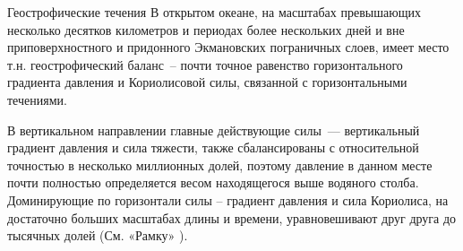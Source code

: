 
\begin{chapter}{Геострофические течения}\label{chap:10}
В открытом океане, на масштабах превышающих несколько десятков
километров и периодах более нескольких дней и вне приповерхностного и
придонного Экмановских пограничных слоев, имеет место
т.н. геострофический баланс~-- почти точное равенство
горизонтального градиента давления и Кориолисовой силы, связанной с
горизонтальными течениями.
%

В вертикальном направлении главные действующие силы~--- вертикальный
градиент давления и сила тяжести, также сбалансированы с относительной
точностью в несколько миллионных долей, поэтому давление в данном
месте почти полностью определяется весом находящегося выше водяного
столба. Доминирующие по горизонтали силы – градиент давления и сила
Кориолиса, на достаточно больших масштабах длины и времени,
уравновешивают друг друга до тысячных долей (См. «Рамку» ).
%


\end{chapter}
